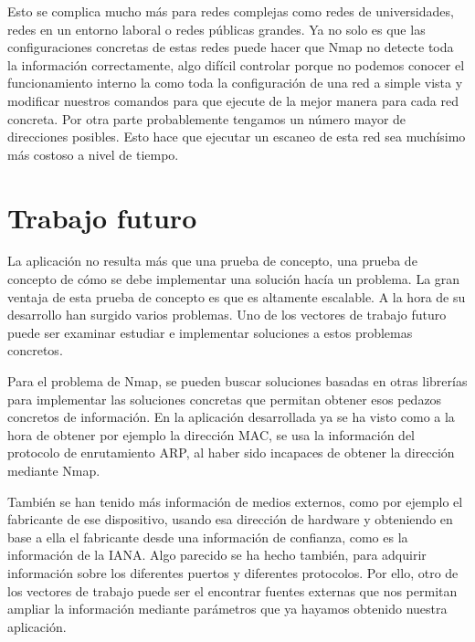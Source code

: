 Esto se complica mucho más para redes complejas como redes de universidades, redes en un entorno laboral o redes públicas grandes. Ya no solo es que las configuraciones concretas de estas redes puede hacer que Nmap no detecte toda la información correctamente, algo difícil controlar porque no podemos conocer el funcionamiento interno la como toda la configuración de una red a simple vista y modificar nuestros comandos para que ejecute de la mejor manera para cada red concreta. Por otra parte probablemente tengamos un número mayor de direcciones posibles. Esto hace que ejecutar un escaneo de esta red sea muchísimo más costoso a nivel de tiempo.

\section{Trabajo futuro}

La aplicación no resulta más que una prueba de concepto, una prueba de concepto de cómo se debe implementar una solución hacía un problema. La gran ventaja de esta prueba de concepto es que es altamente escalable. A la hora de su desarrollo han surgido varios problemas. Uno de los vectores de trabajo futuro puede ser examinar estudiar e implementar soluciones a estos problemas concretos. 

Para el problema de Nmap, se pueden buscar soluciones basadas en otras librerías para implementar las soluciones concretas que permitan obtener esos pedazos concretos de información. En la aplicación desarrollada ya se ha visto como a la hora de obtener por ejemplo la dirección MAC, se usa la información del protocolo de enrutamiento ARP, al haber sido incapaces de obtener la dirección mediante Nmap. 

También se han tenido más información de medios externos, como por ejemplo el fabricante de ese dispositivo, usando esa dirección de hardware y obteniendo en base a ella el fabricante desde una información de confianza, como es la información de la IANA. Algo parecido se ha hecho también, para adquirir información sobre los diferentes puertos y diferentes protocolos. Por ello, otro de los vectores de trabajo puede ser el encontrar fuentes externas que nos permitan ampliar la información mediante parámetros que ya hayamos obtenido nuestra aplicación.
